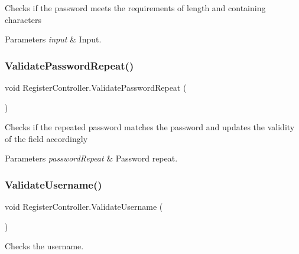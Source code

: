Checks if the password meets the requirements of length and containing characters 


\begin{DoxyParams}{Parameters}
{\em input} & Input.\\
\hline
\end{DoxyParams}
\mbox{\label{classRegisterController_a0cb0ad305504222292c52f22f558822e}} 
\subsubsection{\texorpdfstring{Validate\+Password\+Repeat()}{ValidatePasswordRepeat()}}
{\footnotesize\ttfamily void Register\+Controller.\+Validate\+Password\+Repeat (\begin{DoxyParamCaption}{ }\end{DoxyParamCaption})\hspace{0.3cm}{\ttfamily [inline]}}



Checks if the repeated password matches the password and updates the validity of the field accordingly 


\begin{DoxyParams}{Parameters}
{\em password\+Repeat} & Password repeat.\\
\hline
\end{DoxyParams}
\mbox{\label{classRegisterController_ab1addfaffc04ea9065b81724d4f7e8cb}} 
\subsubsection{\texorpdfstring{Validate\+Username()}{ValidateUsername()}}
{\footnotesize\ttfamily void Register\+Controller.\+Validate\+Username (\begin{DoxyParamCaption}{ }\end{DoxyParamCaption})\hspace{0.3cm}{\ttfamily [inline]}}



Checks the username. 


